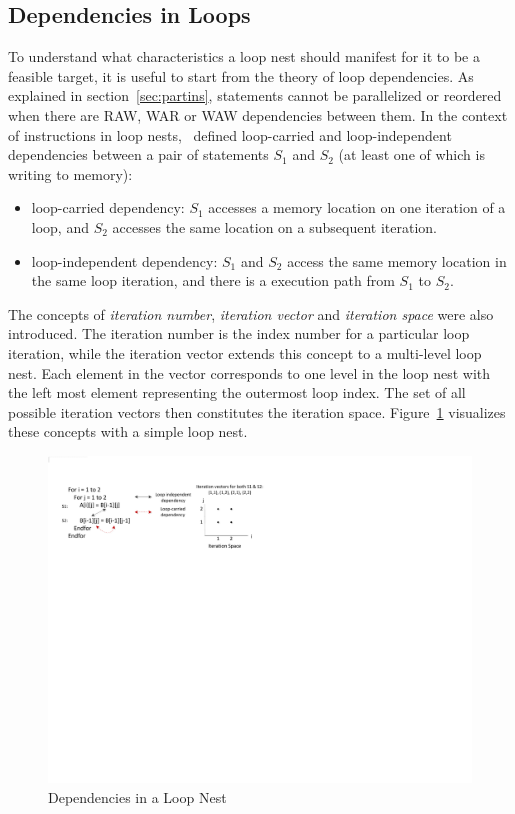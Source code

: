 \subsection{Dependencies in Loops}
To understand what characteristics a loop nest should manifest for it to be a feasible target, it is useful to start from the theory of loop dependencies. As
explained in section~\ref{sec:partins}, statements cannot be parallelized or
reordered when there are RAW, WAR or WAW dependencies between them. In the context of instructions in loop nests,~\cite{Kennedy:2001:OCM:502981} defined
loop-carried and loop-independent dependencies between a pair of statements $S_1$ and $S_2$ (at least one of which is writing to memory):
\begin{itemize}
    \item loop-carried dependency: $S_1$ accesses a memory location 
    on one iteration of a loop, and $S_2$ accesses the same location on a subsequent iteration. 
    \item loop-independent dependency: $S_1$ and $S_2$ access the same memory location in the same loop iteration, and there is a execution path from $S_1$ to $S_2$. 
\end{itemize}
The concepts of \textit{iteration number}, \textit{iteration vector} and \textit{iteration space} were also introduced. The iteration number is the 
index number for a particular loop iteration, while the iteration vector
extends this concept to a multi-level loop nest. Each element in the vector
corresponds to one level in the loop nest with the left most element representing the outermost loop index. The set of all possible iteration vectors then
constitutes the iteration space. Figure~\ref{fig:inivis} visualizes these concepts with a simple loop nest. 

\begin{figure}[htp]
\begin{center}
\includegraphics[width=0.9\linewidth]{chap6fig/iterationSp.pdf}
\caption{Dependencies in a Loop Nest
\label{fig:inivis}}
\end{center}
\end{figure}

